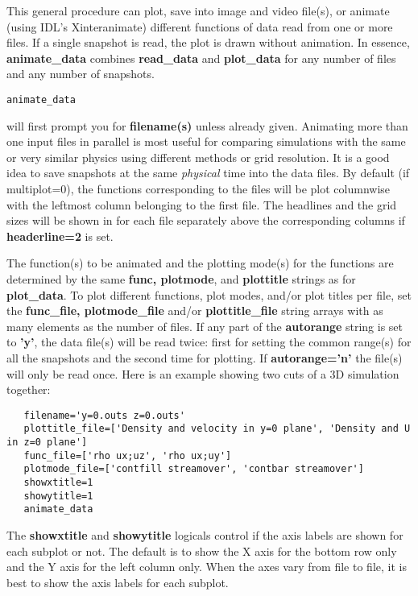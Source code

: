 \documentclass{article}
\begin{document}
This general procedure can plot, save into image and video file(s), or animate 
(using IDL's Xinteranimate) different functions of data 
read from one or more files. If a single snapshot is read, the
plot is drawn without animation. In essence, {\bf animate\_data} combines
{\bf read\_data} and {\bf plot\_data} for any number of files and any number 
of snapshots.
\begin{verbatim}
animate_data
\end{verbatim}
will first prompt you for {\bf filename(s)} unless already given. 
Animating more than one input files in parallel is
most useful for comparing simulations with the same or very similar physics
using different methods or grid resolution. It is a good idea to save 
snapshots at the same {\it physical} time into the data files.
By default (if multiplot=0), 
the functions corresponding to the files will be plot columnwise
with the leftmost column belonging to the first file.
The headlines and the grid sizes will be shown in 
for each file separately above the corresponding columns
if {\bf headerline=2} is set.

The function(s) to be animated and the plotting mode(s) for the functions 
are determined by the same {\bf func, plotmode}, and {\bf plottitle} 
strings as for {\bf plot\_data}. To plot different functions, plot modes,
and/or plot titles per file, set the {\bf func\_file, plotmode\_file} and/or
{\bf plottitle\_file} string arrays with as many elements as the number of files.
If any part of the {\bf autorange} string is set to {\bf 'y'},
the data file(s) will be read twice: first for setting the common range(s) 
for all the snapshots and the second time for plotting.
If {\bf autorange='n'} the file(s) will only be read once.
Here is an example showing two cuts of a 3D simulation together:
\begin{verbatim}
   filename='y=0.outs z=0.outs'
   plottitle_file=['Density and velocity in y=0 plane', 'Density and U in z=0 plane']
   func_file=['rho ux;uz', 'rho ux;uy']
   plotmode_file=['contfill streamover', 'contbar streamover']
   showxtitle=1
   showytitle=1
   animate_data
\end{verbatim}
The {\bf showxtitle} and {\bf showytitle} logicals control if the axis labels are shown
for each subplot or not. The default is to show the X axis for the bottom row only
and the Y axis for the left column only. When the axes vary from file to file, it is best
to show the axis labels for each subplot.
\end{document}
